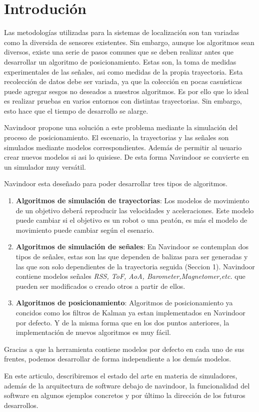 \section{Introdución}


Las metodologías utilizadas para la sistemas de localización son tan variadas como la diversida de sensores existentes. Sin embargo, aunque los algoritmos sean diversos, existe una serie de pasos comunes que se deben realizar antes que desarrollar un algoritmo de posicionamiento. Estas son, la toma de medidas experimentales de las señales, asi como medidas de la propia trayectoria. Esta recolección de datos debe ser variada, ya que la colección en pocas casuísticas puede agregar sesgos no deseados a nuestros algoritmos. Es por ello que lo ideal es realizar pruebas en varios entornos con distintas trayectorias. Sin embargo, esto hace que el tiempo de desarrollo se alarge. 

Navindoor propone una solución a este problema mediante la simulación del proceso de posicionamiento. El escenario, la trayectorias y las señales son simulados mediante modelos correspondientes. Además de permitir al usuario crear nuevos modelos si asi lo quisiese. De esta forma Navindoor se convierte en un simulador muy versátil. 

Navindoor esta deseñado para poder desarrollar tres tipos de algoritmos.
\begin{enumerate}
    \item \textbf{Algoritmos de simulación de trayectorias}: Los modelos de movimiento de un objetivo deberá reproducir las velocidades y aceleraciones. Este modelo puede cambiar si el objetivo es un robot o una peatón, es más el modelo de movimiento puede cambiar según el esenario.
    \item \textbf{Algoritmos de simulación de señales}: En Navindoor se contemplan dos tipos de señales, estas son las que dependen de  balizas para ser generadas y las que son solo dependientes de la trayectoria seguida (Seccion 1). Navindoor contiene modelos señales  \emph{RSS, ToF, AoA, Barometer,Magnetomer,etc.} que pueden ser modificados o creado otros a partir de ellos.
    \item \textbf{Algoritmos de posicionamiento}: Algoritmos de posicionamiento ya concidos como los filtros de Kalman ya estan implementados en Navindoor por defecto. Y de la misma forma que en los dos puntos anteriores, la implementación de nuevos algoritmos es muy fácil.
\end{enumerate}

Gracias a que la herramienta contiene modelos por defecto en cada uno de sus frentes, podemos desarrollar de forma independiente a los demás modelos. 

En este articulo, describiremos el estado del arte en materia de simuladores, además de la arquitectura de software debajo de navindoor, la funcionalidad del software en algunos ejemplos concretos y por último la dirección de los futuros desarrollos.  

